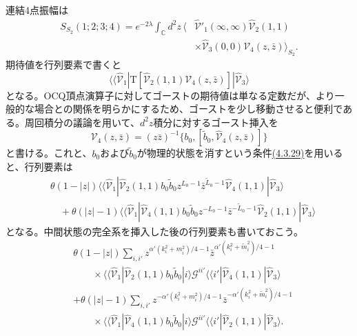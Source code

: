 連結4点振幅は
\begin{equation}
 \begin{aligned}
 S_{S_2}(1;2;3;4)=e^{-2\lambda}\int_{\mathbb C}d^2z\,
 \big\langle&\widehat{\mathcal V}'_1(\infty,\infty)
 \widehat{\mathcal V}_2(1,1)\\[-2pt]
 &\times\widehat{\mathcal V}_3(0,0)\mathcal V_4(z,\bar z)\big\rangle_{S_2}.
 \end{aligned}
 \tag{9.1.16}\label{eq:9.1.16}
\end{equation}
期待値を行列要素で書くと
\begin{equation}
 \langle\!\langle\widehat{\mathcal V}_1|
 \mathrm T[\widehat{\mathcal V}_2(1,1)\mathcal V_4(z,\bar z)]
 |\widehat{\mathcal V}_3\rangle
 \tag{9.1.17}\label{eq:9.1.17}
\end{equation}
となる。OCQ頂点演算子に対してゴーストの期待値は単なる定数だが、より一般的な場合との関係を明らかにするため、ゴーストを少し移動させると便利である。周回積分の議論を用いて、$d^2z$積分に対するゴースト挿入を
\begin{equation}
 \mathcal V_4(z,\bar z)=(z\bar z)^{-1}
 \{b_0,[\tilde b_0,\widehat{\mathcal V}_4(z,\bar z)]\}
 \tag{9.1.18}\label{eq:9.1.18}
\end{equation}
と書ける。これと、$b_0$および$\tilde b_0$が物理的状態を消すという条件\hyperref[eq:4.3.29]{(4.3.29)}を用いると、行列要素は
\begin{equation}
 \begin{aligned}
 &\theta(1-|z|)\langle\!\langle\widehat{\mathcal V}_1|
 \widehat{\mathcal V}_2(1,1)b_0\tilde b_0
 z^{L_0-1}\bar z^{\tilde L_0-1}\widehat{\mathcal V}_4(1,1)
 |\widehat{\mathcal V}_3\rangle\\
 &\quad+\theta(|z|-1)\langle\!\langle\widehat{\mathcal V}_1|
 \widehat{\mathcal V}_4(1,1)b_0\tilde b_0
 z^{-L_0-1}\bar z^{-\tilde L_0-1}\widehat{\mathcal V}_2(1,1)
 |\widehat{\mathcal V}_3\rangle
 \end{aligned}
 \tag{9.1.19}\label{eq:9.1.19}
\end{equation}
となる。中間状態の完全系を挿入した後の行列要素も書いておこう。
\begin{equation}
 \begin{aligned}
 &\theta(1-|z|)\sum_{i,i'}
 z^{\alpha'(k_i^2+m_i^2)/4-1}\bar z^{\alpha'(k_i^2+\tilde m_i^2)/4-1}\\
 &\qquad\times\langle\!\langle\widehat{\mathcal V}_1|
 \widehat{\mathcal V}_2(1,1)b_0\tilde b_0|i\rangle
 \mathcal G^{ii'}\langle\!\langle i'|
 \widehat{\mathcal V}_4(1,1)|\widehat{\mathcal V}_3\rangle\\
 &+\theta(|z|-1)\sum_{i,i'}
 z^{-\alpha'(k_i^2+m_i^2)/4-1}\bar z^{-\alpha'(k_i^2+\tilde m_i^2)/4-1}\\
 &\qquad\times\langle\!\langle\widehat{\mathcal V}_1|
 \widehat{\mathcal V}_4(1,1)b_0\tilde b_0|i\rangle
 \mathcal G^{ii'}\langle\!\langle i'|
 \widehat{\mathcal V}_2(1,1)|\widehat{\mathcal V}_3\rangle.
 \end{aligned}
 \tag{9.1.20}\label{eq:9.1.20}
\end{equation}
